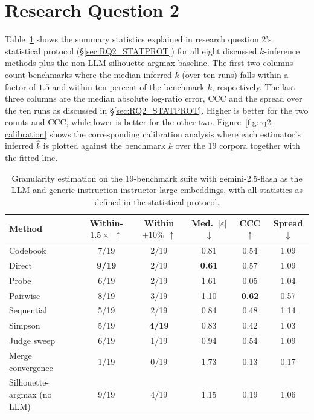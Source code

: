 \documentclass[11pt,a4paper,oneside]{report}
\begin{document}
\section{Research Question 2}

Table~\ref{tab:rq2-scoreboard} shows the summary statistics explained in research question 2's statistical protocol (\S\ref{sec:RQ2_STATPROT}) for all eight discussed $k$-inference methods plus the non-LLM silhouette-argmax baseline. The first two columns count benchmarks where the median inferred $k$ (over ten runs) falls within a factor of $1.5$ and within ten percent of the benchmark $k$, respectively. The last three columns are the median absolute log-ratio error, CCC and the spread over the ten runs as discussed in \S\ref{sec:RQ2_STATPROT}. Higher is better for the two counts and CCC, while lower is better for the other two. Figure~\ref{fig:rq2-calibration} shows the corresponding calibration analysis where each estimator's inferred $\hat{k}$ is plotted against the benchmark $k$ over the 19 corpora together with the fitted line.

\begin{table}[htbp]
\centering
\small
\begin{tabular}{lccccc}
\toprule
Method & Within-$1.5\times$ $\uparrow$ & Within $\pm10\%$ $\uparrow$ & Med.\ $|\varepsilon|$ $\downarrow$ & CCC $\uparrow$ & Spread $\downarrow$ \\
\midrule
Codebook & 7/19 & 2/19 & 0.81 & 0.54 & 1.09 \\
Direct & \textbf{9/19} & 2/19 & \textbf{0.61} & 0.57 & 1.09 \\
Probe & 6/19 & 2/19 & 1.61 & 0.05 & 1.04 \\
Pairwise & 8/19 & 3/19 & 1.10 & \textbf{0.62} & 0.57 \\
Sequential & 5/19 & 2/19 & 0.84 & 0.48 & 1.14 \\
Simpson & 5/19 & \textbf{4/19} & 0.83 & 0.42 & 1.03 \\
Judge sweep & 6/19 & 1/19 & 0.94 & 0.54 & 1.09 \\
Merge convergence & 1/19 & 0/19 & 1.73 & 0.13 & 0.17 \\
\midrule
Silhouette-argmax (no LLM) & 9/19 & 4/19 & 1.15 & 0.19 & 1.06 \\
\bottomrule
\end{tabular}
\caption[Granularity estimation scoreboard]{Granularity estimation on the
19-benchmark suite with {\small\ttfamily gemini-2.5-flash} as the LLM and
generic-instruction {\small\ttfamily instructor-large} embeddings, with all
statistics as defined in the statistical protocol.}
\label{tab:rq2-scoreboard}
\end{table}
\end{document}
